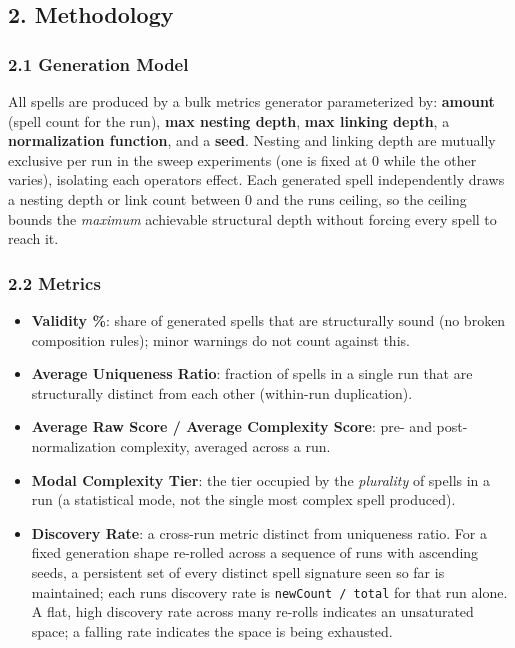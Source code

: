 \documentclass[
  10pt,
  twocolumn]{article}
\providecommand{\tightlist}{%
  \setlength{\itemsep}{0pt}\setlength{\parskip}{0pt}}
\begin{document}
\subsection{2. Methodology}\label{2-methodology}

\subsubsection{2.1 Generation Model}\label{21-generation-model}

All spells are produced by a bulk metrics generator parameterized by:
\textbf{amount} (spell count for the run), \textbf{max nesting depth},
\textbf{max linking depth}, a \textbf{normalization function}, and a
\textbf{seed}. Nesting and linking depth are mutually exclusive per run
in the sweep experiments (one is fixed at 0 while the other varies),
isolating each operator\textquotesingle s effect. Each generated spell
independently draws a nesting depth or link count between 0 and the
run\textquotesingle s ceiling, so the ceiling bounds the \emph{maximum}
achievable structural depth without forcing every spell to reach it.

\subsubsection{2.2 Metrics}\label{22-metrics}

\begin{itemize}
\tightlist
\item
  \textbf{Validity \%}: share of generated spells that are structurally
  sound (no broken composition rules); minor warnings do not count
  against this.
\item
  \textbf{Average Uniqueness Ratio}: fraction of spells in a single run
  that are structurally distinct from each other (within-run
  duplication).
\item
  \textbf{Average Raw Score / Average Complexity Score}: pre- and
  post-normalization complexity, averaged across a run.
\item
  \textbf{Modal Complexity Tier}: the tier occupied by the
  \emph{plurality} of spells in a run (a statistical mode, not the
  single most complex spell produced).
\item
  \textbf{Discovery Rate}: a cross-run metric distinct from uniqueness
  ratio. For a fixed generation shape re-rolled across a sequence of
  runs with ascending seeds, a persistent set of every distinct spell
  signature seen so far is maintained; each run\textquotesingle s
  discovery rate is \texttt{newCount\ /\ total} for that run alone. A
  flat, high discovery rate across many re-rolls indicates an
  unsaturated space; a falling rate indicates the space is being
  exhausted.
\end{itemize}
\end{document}
